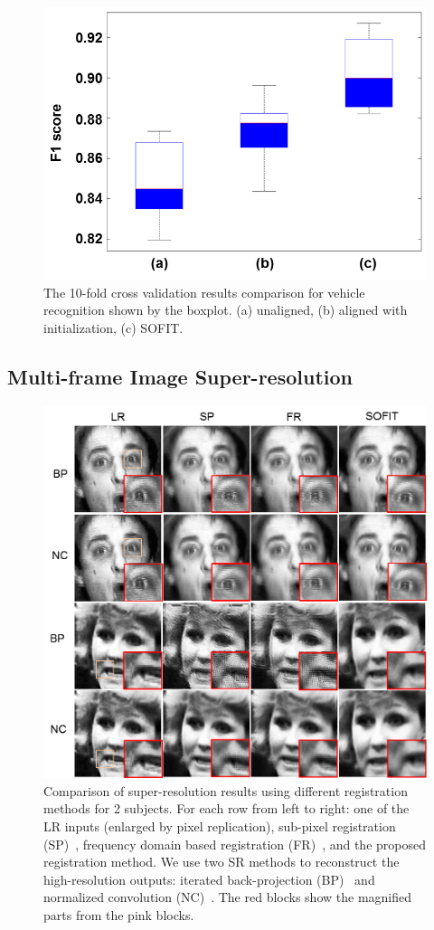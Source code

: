 \documentclass[10pt,journal]{IEEEtran}
\begin{document}
\begin{figure}[htbp]
	\centering
		\includegraphics[width=.6\columnwidth]{fig/vehicle_cls_f1.png}
	\caption{The 10-fold cross validation results comparison for vehicle recognition shown by the boxplot. (a) unaligned, (b) aligned with initialization, (c) SOFIT.}
	\label{fig:fig_vehicle_cls_f1}
\end{figure}

\subsection{Multi-frame Image Super-resolution}

\begin{figure}[t]
	\centering
		\includegraphics[width=\columnwidth]{fig/superResolution.png}
	\caption{Comparison of super-resolution results using different registration methods for 2 subjects. For each row from left to right: one of the LR inputs (enlarged by pixel replication), sub-pixel registration (SP)~\cite{Keren_CVPR88}, frequency domain based registration (FR)~\cite{Vandewalle06}, and the proposed registration method. We use two SR methods to reconstruct the high-resolution outputs: iterated back-projection (BP)~\cite{Irani91} and normalized convolution (NC)~\cite{Pham_06}. The red blocks show the magnified parts from the pink blocks.}
	\label{fig:superResolution}
\end{figure}
\end{document}
